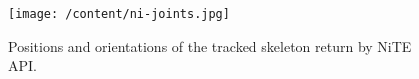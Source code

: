 \begin{figure}
	[h]
	\centering
	\texttt{[image: /content/ni-joints.jpg]} \caption{Positions and orientations of the tracked skeleton return by NiTE API. \cite{12}} \label{fg:ni:joints} 
\end{figure}
